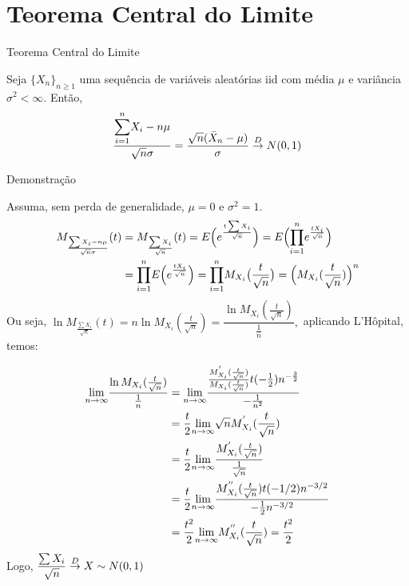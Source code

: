 \documentclass[12pt]{beamer}
\begin{document}
\section{Teorema Central do Limite}
\begin{frame}{Teorema Central do Limite}
\begin{block}{}
\justifying
Seja $\{X_{n}\}_{n\geq 1}$ uma sequência de variáveis aleatórias iid com média $\mu$ e variância $\sigma^{2}<\infty.$ Então,
\begin{align*}
   \dfrac{{\displaystyle \sum_{i=1}^{n}} X_{i}-n\mu}{\sqrt{n}\sigma}=\dfrac{\sqrt{n}(\Bar{X}_{n}-\mu)}{\sigma} \overset{D}{\rightarrow} N(0,1)
\end{align*}
\end{block}
\end{frame}

\begin{frame}{Demonstração}
\begin{block}{}
\justifying
Assuma, sem perda de generalidade, $\mu=0$ e $\sigma^{2}=1.$
\begin{align*}
    M_{\frac{\sum X_{i}-n\mu}{\sqrt{n}\sigma}}(t)&=M_{\frac{\sum X_{i}}{\sqrt{n}}}(t)
    =E\Big(e^{\frac{t\sum X_{i}}{\sqrt{n}}}\Big)=E\Big({\displaystyle \prod_{i=1}^{n}} e^{\frac{tX_{i}}{\sqrt{n}}}\Big)\\
    &={\displaystyle \prod_{i=1}^{n}} E\Big(e^{\frac{tX_{i}}{\sqrt{n}}}\Big)={\displaystyle \prod_{i=1}^{n}} M_{X_{i}}\big(\frac{t}{\sqrt{n}}\big)=\Big(M_{X_{i}}(\dfrac{t}{\sqrt{n}})\Big)^{n}\\
\end{align*}
Ou seja, $\ln{M_{\frac{\sum X_{i}}{\sqrt{n}}}(t)}=n\ln{M_{X_{i}}(\frac{t}{\sqrt{n}})}=\dfrac{\ln{M_{X_{i}}(\frac{t}{\sqrt{n}})}}{\frac{1}{n}},$ aplicando L'Hôpital, temos:
\end{block}
\end{frame}

\begin{frame}{}
\begin{block}{}
\justifying
\begin{align*}
    {\displaystyle \lim_{n\to\infty}} \frac{\ln{M_{X_{i}}(\frac{t}{\sqrt{n}})}}{\frac{1}{n}}&={\displaystyle \lim_{n\to\infty}} \dfrac{\frac{M_{X_{i}}^{'}(\frac{t}{\sqrt{n}})}{M_{X_{i}}(\frac{t}{\sqrt{n}})}t(-\frac{1}{2})n^{-\frac{3}{2}}}{-\frac{1}{n^{2}}}\\
    &=\dfrac{t}{2}{\displaystyle \lim_{n\to\infty}} \sqrt{n}M_{X_{i}}^{'}(\frac{t}{\sqrt{n}})\\
    &=\dfrac{t}{2}{\displaystyle \lim_{n\to\infty}} \dfrac{M_{X_{i}}^{'}(\frac{t}{\sqrt{n}})}{\frac{1}{\sqrt{n}}}\\
    &=\dfrac{t}{2}{\displaystyle \lim_{n\to\infty}} \dfrac{M_{X_{i}}^{''}(\frac{t}{\sqrt{n}})t(-1/2)n^{-3/2}}{-\frac{1}{2}n^{-3/2}}\\
    &=\dfrac{t^{2}}{2}{\displaystyle \lim_{n\to\infty}} M_{X_{i}}^{''}(\frac{t}{\sqrt{n}})=\dfrac{t^{2}}{2}
\end{align*}
Logo, $\dfrac{\sum X_{i}}{\sqrt{n}}\overset{D}{\rightarrow} X\sim N(0,1)$
\end{block}
\end{frame}
\end{document}
